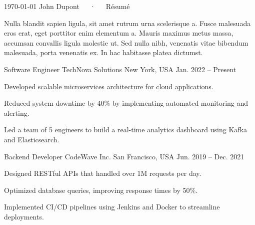 \documentclass[11pt, a4paper]{awesome-cv}
\begin{document}
\makecvheader[C]

\makecvfooter
  {\today}
  {John Dupont~~~·~~~Résumé}
  {\thepage}




\begin{cvparagraph}
Nulla blandit sapien ligula, sit amet rutrum urna scelerisque a. Fusce malesuada eros erat, eget porttitor enim elementum a.
Mauris maximus metus massa, accumsan convallis ligula molestie ut. Sed nulla nibh, venenatis vitae bibendum malesuada, porta venenatis ex.
In hac habitasse platea dictumst.
\end{cvparagraph}


\cventry
   {Software Engineer} %
   {TechNova Solutions} %
   {New York, USA} %
   {Jan. 2022 -- Present} %
   {
     \begin{cvitems} %
     	\item Developed scalable microservices architecture for cloud applications.
		\item Reduced system downtime by 40\% by implementing automated monitoring and alerting.
		\item Led a team of 5 engineers to build a real-time analytics dashboard using Kafka and Elasticsearch.
     \end{cvitems}
   }
\cventry
   {Backend Developer} %
   {CodeWave Inc.} %
   {San Francisco, USA} %
   {Jun. 2019 -- Dec. 2021} %
   {
     \begin{cvitems} %
     	\item Designed RESTful APIs that handled over 1M requests per day.
		\item Optimized database queries, improving response times by 50\%.
		\item Implemented CI/CD pipelines using Jenkins and Docker to streamline deployments.
     \end{cvitems}
   }
\end{document}
